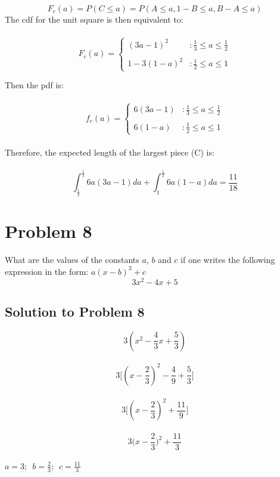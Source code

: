 \documentclass{article}
\begin{document}
$$ F_{c}(a) = P(C \le a) = P(A \le a, 1-B \le a, B-A \le a)$$
The cdf for the unit square is then equivalent to: \\\\
\[F_{c}(a) = \left\{
\begin{array}{lr}
(3a-1)^2 & : \frac{1}{3} \le a \le \frac{1}{2} \\\\
1-3(1-a)^2 & : \frac{1}{2} \le a \le 1
\end{array}
\right.
\]

Then the pdf is: \\\\
\[f_{c}(a) = \left\{
\begin{array}{lr}
6(3a-1) & : \frac{1}{3} \le a \le \frac{1}{2} \\\\
6(1-a) & : \frac{1}{2} \le a \le 1
\end{array}
\right.
\]
\\
Therefore, the expected length of the largest piece (C) is: \\\\
$$\int_{\frac{1}{2}}^{\frac{1}{3}} 6a(3a-1)da + \int_{1}^{\frac{1}{2}} 6a(1-a)da = \frac{11}{18}$$


\section{Problem 8}
What are the values of the constants $a$, $b$ and $c$ if one writes the following expression in the form: $ a(x - b)^{2} + c$ \\ 

 \begin{equation}\label{key}
 3x^{2} - 4x + 5
 \end{equation}
 
\subsection{Solution to Problem 8}
$$ 3(x^2 - \frac{4}{3}x + \frac{5}{3})$$ \\
$$ 3 \Big[ (x - \frac{2}{3})^2 -\frac{4}{9} + \frac{5}{3} \Big] $$ \\
$$ 3 \Big[ (x - \frac{2}{3})^2 + \frac{11}{9} \Big]  $$ \\
$$ 3 \big(x - \frac{2}{3}\big)^2 + \frac{11}{3}  $$ \\
$ a =3; \enspace b= \frac{2}{3}; \enspace c= \frac{11}{3} $
\end{document}
